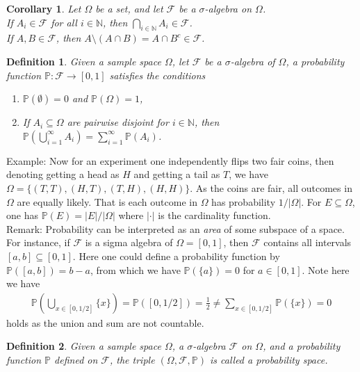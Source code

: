 \documentclass[11pt, onesided]{book}
\theoremstyle{break}
\theoremstyle{break}
\newtheorem{cor}{Corollary}[thm]
\newtheorem{defn}{Definition}[thm]
\newcommand{\N}{\mathbb{N}}
\newcommand{\remark}{\color{blue}Remark: \color{black}}
\newcommand{\example}{\color{green}Example: \color{black}}
\begin{document}
\begin{cor}
Let $\Omega$ be a set, and let $\mathcal{F}$ be a $\sigma$-algebra on $\Omega$. \\
If $A_i \in \mathcal{F}$ for all $i \in \N$, then $\bigcap_{i \in \N}A_i \in \mathcal{F}$. \\
If $A, B \in \mathcal{F}$, then $A \setminus (A\cap B)=A \cap B^c \in \mathcal{F}$. 
\end{cor}

\begin{defn}
Given a sample space $\Omega$, let $\mathcal{F}$ be a $\sigma$-algebra of $\Omega$, a probability function $\mathbb{P}: \mathcal{F} \to [0,1]$ satisfies the conditions
\begin{enumerate}[topsep=3pt,itemsep=-1ex,partopsep=1ex,parsep=1ex]
\item $\mathbb{P}(\emptyset) = 0$ and $\mathbb{P}(\Omega) = 1$,
\item If $A_i \subseteq \Omega$ are pairwise disjoint for $i \in \N$, then $\mathbb{P}(\bigcup_{i=1}^\infty A_i) =\sum_{i=1}^\infty \mathbb{P}(A_i)$.
\end{enumerate}
\end{defn}


\example Now for an experiment one independently flips two fair coins, then denoting getting a head as $H$ and getting a tail as $T$, we have $\Omega = \{(T,T), (H,T), (T,H), (H,H)\}$. As the coins are fair, all outcomes in $\Omega$ are equally likely. That is each outcome in $\Omega$ has probability $1/|\Omega|$. For $E \subseteq \Omega$, one has $\mathbb{P}(E) = |E|/|\Omega|$ where $|\cdot |$ is the cardinality function.\\

\remark Probability can be interpreted as an \textit{area} of some subspace of a space. For instance, if $\mathcal{F}$ is a sigma algebra of $\Omega = [0,1]$, then $\mathcal{F}$ contains all intervals $[a,b] \subseteq [0,1]$. Here one could define a probability function by $\mathbb{P}([a,b]) = b-a$, from which we have $\mathbb{P}(\{a\}) = 0$ for $a \in [0,1]$. Note here we have
\begin{align*}
\mathbb{P}\left( \bigcup_{x \in [0,1/2]}\{x\}\right) = \mathbb{P}([0,1/2]) =\frac{1}{2} \neq \sum_{x \in [0,1/2]}\mathbb{P}(\{x\}) = 0
\end{align*}
holds as the union and sum are not countable.

\begin{defn}
Given a sample space $\Omega$, a $\sigma$-algebra $\mathcal{F}$ on $\Omega$, and a probability function $\mathbb{P}$ defined on $\mathcal{F}$, the triple $(\Omega, \mathcal{F}, \mathbb{P})$ is called a probability space. 
\end{defn}
\end{document}
